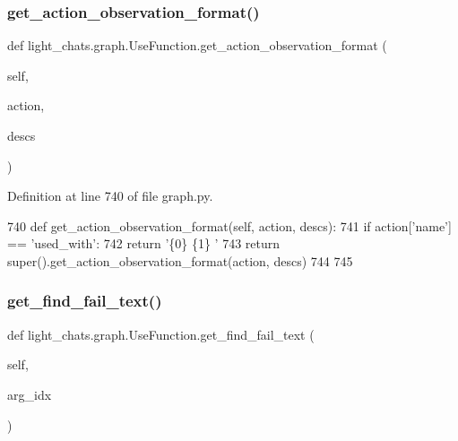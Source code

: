 \subsubsection{\texorpdfstring{get\+\_\+action\+\_\+observation\+\_\+format()}{get\_action\_observation\_format()}}
{\footnotesize\ttfamily def light\+\_\+chats.\+graph.\+Use\+Function.\+get\+\_\+action\+\_\+observation\+\_\+format (\begin{DoxyParamCaption}\item[{}]{self,  }\item[{}]{action,  }\item[{}]{descs }\end{DoxyParamCaption})}



Definition at line 740 of file graph.\+py.


\begin{DoxyCode}
740     \textcolor{keyword}{def }get\_action\_observation\_format(self, action, descs):
741         \textcolor{keywordflow}{if} action[\textcolor{stringliteral}{'name'}] == \textcolor{stringliteral}{'used\_with'}:
742             \textcolor{keywordflow}{return} \textcolor{stringliteral}{'\{0\} \{1\} '}
743         \textcolor{keywordflow}{return} super().get\_action\_observation\_format(action, descs)
744 
745 
\end{DoxyCode}
\mbox{\label{classlight__chats_1_1graph_1_1UseFunction_a44e9ef0d0d915c32926944fd4da8e332}} 
\subsubsection{\texorpdfstring{get\+\_\+find\+\_\+fail\+\_\+text()}{get\_find\_fail\_text()}}
{\footnotesize\ttfamily def light\+\_\+chats.\+graph.\+Use\+Function.\+get\+\_\+find\+\_\+fail\+\_\+text (\begin{DoxyParamCaption}\item[{}]{self,  }\item[{}]{arg\+\_\+idx }\end{DoxyParamCaption})}



